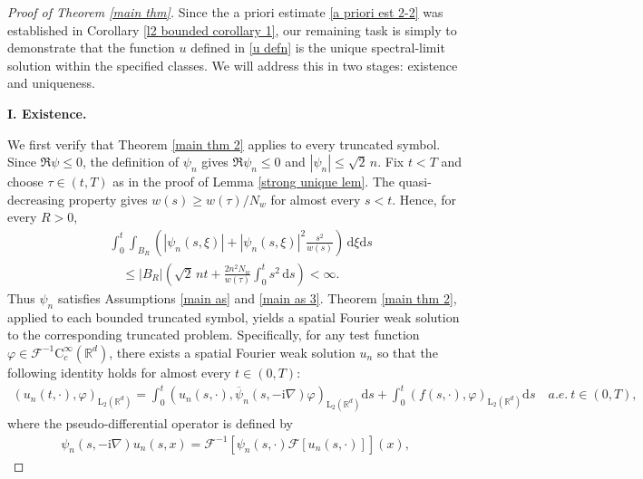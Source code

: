 \documentclass[11pt,reqno]{amsart}
\theoremstyle{definition}
\theoremstyle{remark}
\newcommand\bR{\mathbb{R}}
\newcommand\cF{\mathcal{F}}
\numberwithin{equation}{section}
\begin{document}
\vspace{3mm}
\begin{proof}[Proof of Theorem \ref{main thm}]




Since the a priori estimate \eqref{a priori est 2-2} was established in Corollary \ref{l2 bounded corollary 1}, our remaining task is simply to demonstrate that the function $u$ defined in \eqref{u defn} is the unique spectral-limit solution within the specified classes. 
We will address this in two stages: existence and uniqueness.



\vspace{2mm}
{\bf I. Existence.}
\vspace{2mm}




We first verify that Theorem \ref{main thm 2} applies to every truncated
symbol.  Since $\Re\psi\leq0$, the definition of $\psi_n$ gives
$\Re\psi_n\leq0$ and $|\psi_n|\leq\sqrt{2}\,n$.  Fix $t<T$ and choose
$\tau\in(t,T)$ as in the proof of Lemma \ref{strong unique lem}.  The
quasi-decreasing property gives $w(s)\geq w(\tau)/N_w$ for almost every
$s<t$.  Hence, for every $R>0$,
\begin{align*}
&\int_0^t\int_{B_R}\left(|\psi_n(s,\xi)|
+|\psi_n(s,\xi)|^2\frac{s^2}{w(s)}\right)\,\mathrm{d}\xi\mathrm{d}s\\
&\quad\leq |B_R|\left(\sqrt{2}\,nt
+\frac{2n^2N_w}{w(\tau)}\int_0^t s^2\,\mathrm{d}s\right)<\infty.
\end{align*}
Thus $\psi_n$ satisfies Assumptions \ref{main as} and \ref{main as 3}.
Theorem \ref{main thm 2}, applied to each bounded truncated symbol, yields a spatial Fourier weak solution to the corresponding truncated problem.
Specifically, for any test function $\varphi \in \cF^{-1}\mathrm{C}_c^\infty(\bR^d)$, 
there exists a spatial Fourier weak solution $u_n$  so that the following identity holds for almost every $t \in (0,T)$:
\begin{align*}
\left(u_n(t,\cdot),\varphi\right)_{\mathrm{L}_2(\bR^d)} =  \int_0^t \left(u_n(s,\cdot) , \overline \psi_n(s,-\mathrm{i}\nabla)\varphi \right)_{\mathrm{L}_2(\bR^d)} \mathrm{d}s 
+ \int_0^t \left( f(s,\cdot),\varphi\right)_{\mathrm{L}_2(\bR^d)} \mathrm{d}s
\quad a.e.~t\in (0,T),
\end{align*}
where the pseudo-differential operator is defined by
\begin{align*}
\psi_{n}(s,-\mathrm{i}\nabla)u_n(s,x)
=\cF^{-1} \left[  \psi_{n}(s,\cdot)  \cF[u_n(s,\cdot)]\right](x),

\end{align*}
\end{proof}
\end{document}
